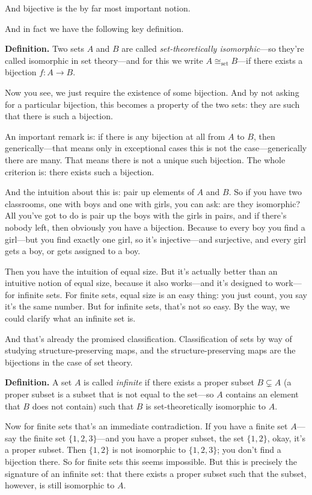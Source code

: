 And bijective is the by far most important notion.

And in fact we have the following key definition.

\textbf{Definition.} Two sets $A$ and $B$ are called \emph{set-theoretically isomorphic}---so they're called isomorphic in set theory---and for this we write $A \cong_{\mathrm{set}} B$---if there exists a bijection $f : A \to B$.

Now you see, we just require the existence of some bijection. And by not asking for a particular bijection, this becomes a property of the two sets: they are such that there is such a bijection.

An important remark is: if there is any bijection at all from $A$ to $B$, then generically---that means only in exceptional cases this is not the case---generically there are many. That means there is not a unique such bijection. The whole criterion is: there exists such a bijection.

And the intuition about this is: pair up elements of $A$ and $B$. So if you have two classrooms, one with boys and one with girls, you can ask: are they isomorphic? All you've got to do is pair up the boys with the girls in pairs, and if there's nobody left, then obviously you have a bijection. Because to every boy you find a girl---but you find exactly one girl, so it's injective---and surjective, and every girl gets a boy, or gets assigned to a boy.

Then you have the intuition of equal size. But it's actually better than an intuitive notion of equal size, because it also works---and it's designed to work---for infinite sets. For finite sets, equal size is an easy thing: you just count, you say it's the same number. But for infinite sets, that's not so easy. By the way, we could clarify what an infinite set is.

And that's already the promised classification. Classification of sets by way of studying structure-preserving maps, and the structure-preserving maps are the bijections in the case of set theory.

\textbf{Definition.} A set $A$ is called \emph{infinite} if there exists a proper subset $B \subsetneq A$ (a proper subset is a subset that is not equal to the set---so $A$ contains an element that $B$ does not contain) such that $B$ is set-theoretically isomorphic to $A$.

Now for finite sets that's an immediate contradiction. If you have a finite set $A$---say the finite set $\{1, 2, 3\}$---and you have a proper subset, the set $\{1, 2\}$, okay, it's a proper subset. Then $\{1, 2\}$ is not isomorphic to $\{1, 2, 3\}$; you don't find a bijection there. So for finite sets this seems impossible. But this is precisely the signature of an infinite set: that there exists a proper subset such that the subset, however, is still isomorphic to $A$.

